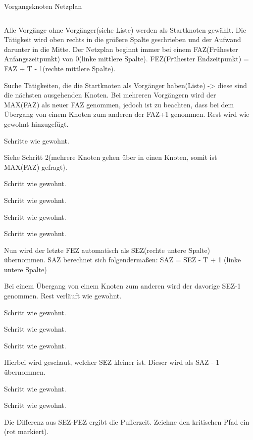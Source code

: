 \documentclass{beamer}
\begin{document}
\begin{frame}[t,shrink=60]{Vorgangsknoten Netzplan}
\begin{columns}
\par\vspace{2 cm}\noindent %
\begin{itemize}

{\LARGE
    \item<only@+> {Alle Vorgänge ohne Vorgänger(siehe Liste) werden als Startknoten gewählt. Die Tätigkeit wird oben rechts in die größere Spalte geschrieben und der Aufwand darunter in die Mitte. Der Netzplan beginnt immer bei einem FAZ(Frühester Anfangszeitpunkt) von 0(linke mittlere Spalte). FEZ(Frühester Endzeitpunkt) = FAZ + T - 1(rechte mittlere Spalte).}

    \item<only@+> {Suche Tätigkeiten, die die Startknoten als Vorgänger haben(Liste) -{\textgreater} diese sind die nächsten ausgehenden Knoten. Bei mehreren Vorgängern wird der MAX(FAZ) als neuer FAZ genommen, jedoch ist zu beachten, dass bei dem Übergang von einem Knoten zum anderen der FAZ+1 genommen. Rest wird wie gewohnt hinzugefügt.}
    \item<only@+> {Schritte wie gewohnt.}
    \item<only@+> {Siehe Schritt 2(mehrere Knoten gehen über in einen Knoten, somit ist MAX(FAZ) gefragt).}
    \item<only@+> {Schritt wie gewohnt.}
    \item<only@+> {Schritt wie gewohnt.}
    \item<only@+> {Schritt wie gewohnt.}
    \item<only@+> {Schritt wie gewohnt.}
    \item<only@+> {Nun wird der letzte FEZ automatisch als SEZ(rechte untere Spalte) übernommen. SAZ berechnet sich folgendermaßen: SAZ = SEZ - T + 1 (linke untere Spalte)}
    \item<only@+> {Bei einem Übergang von einem Knoten zum anderen wird der davorige SEZ-1 genommen. Rest verläuft wie gewohnt.}
    \item<only@+> {Schritt wie gewohnt.}
    \item<only@+> {Schritt wie gewohnt.}
    \item<only@+> {Schritt wie gewohnt.}
    \item<only@+> {Hierbei wird geschaut, welcher SEZ kleiner ist. Dieser wird als SAZ - 1 übernommen.}
    \item<only@+> {Schritt wie gewohnt.}
    \item<only@+> {Schritt wie gewohnt.}
    \item<only@+> {Die Differenz aus SEZ-FEZ ergibt die Pufferzeit. Zeichne den kritischen Pfad ein (rot markiert).}
    \item \alert<+> {}
}


\end{itemize}
\end{columns}
\end{frame}
\end{document}
